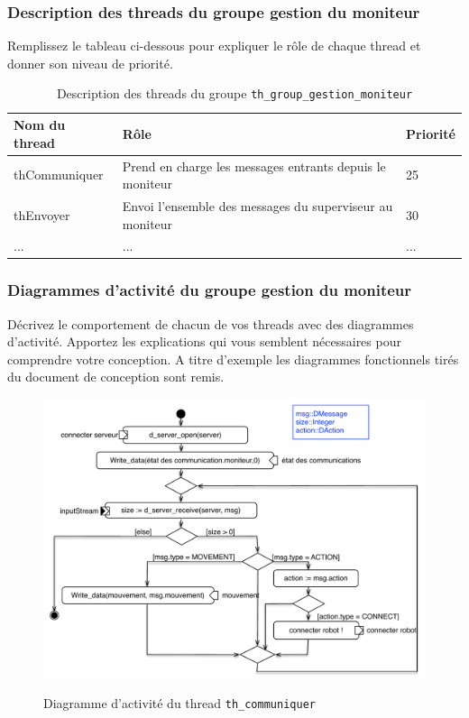 \documentclass[11pt, a4paper]{paper}
\begin{document}
\subsubsection{Description des threads  du groupe gestion du moniteur}
{\color{red} Remplissez le tableau ci-dessous pour expliquer le rôle de chaque thread et donner son niveau de priorité.}


\begin{table}[htp]
\caption{Description des threads du groupe {\tt th\_group\_gestion\_moniteur}}
\begin{center}
\begin{tabular}{|p{3cm}|p{8.5cm}|p{2cm}|}
\hline
\bf Nom du thread &	\bf Rôle &	\bf Priorité \\
\hline
\hline
\color{black}thCommuniquer	& \color{black}Prend en charge les messages entrants depuis le moniteur & \color{black}25\\
\hline
\color{black}thEnvoyer	& \color{black}Envoi l'ensemble des messages du superviseur au moniteur & \color{black}30\\
\hline
\color{black}... &	\color{black}... &	\color{black}...\\
\hline
\end{tabular}
\end{center}
\label{tab:gt_moniteur}
\end{table}%

\subsubsection{Diagrammes d'activité  du groupe gestion du moniteur}
{\color{red}Décrivez le comportement de chacun de vos threads avec des diagrammes d'activité. Apportez les explications qui vous semblent nécessaires pour comprendre votre conception. A titre d'exemple les diagrammes fonctionnels tirés du document de conception sont remis.}

\begin{figure}[htbp]
\label{fig:act_communiquer}
\begin{center}
{\includegraphics[scale=.5]{./figures-pdf/act_communiquer}}
{\caption{Diagramme d'activité du thread {\tt th\_communiquer}}}
\end{center}
\end{figure}
\FloatBarrier
\end{document}
